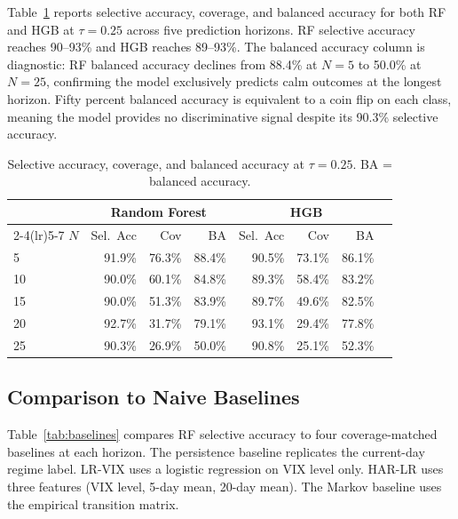\documentclass[runningheads]{llncs}
\begin{document}
Table~\ref{tab:main} reports selective accuracy, coverage, and balanced
accuracy for both RF and HGB at $\tau = 0.25$ across five prediction horizons.
RF selective accuracy reaches 90--93\% and HGB reaches 89--93\%.
The balanced accuracy column is diagnostic: RF balanced accuracy declines from
88.4\% at $N=5$ to 50.0\% at $N=25$, confirming the model exclusively
predicts calm outcomes at the longest horizon. Fifty percent balanced accuracy
is equivalent to a coin flip on each class, meaning the model provides no
discriminative signal despite its 90.3\% selective accuracy.

\begin{table}[t]
\centering
\caption{Selective accuracy, coverage, and balanced accuracy at $\tau=0.25$.
BA = balanced accuracy.}
\label{tab:main}
\setlength{\tabcolsep}{5pt}
\begin{tabular}{lrrrrrrr}
\toprule
 & \multicolumn{3}{c}{Random Forest} & \multicolumn{3}{c}{HGB} \\
\cmidrule(lr){2-4}\cmidrule(lr){5-7}
$N$ & Sel.\ Acc & Cov & BA & Sel.\ Acc & Cov & BA \\
\midrule
5  & 91.9\% & 76.3\% & 88.4\% & 90.5\% & 73.1\% & 86.1\% \\
10 & 90.0\% & 60.1\% & 84.8\% & 89.3\% & 58.4\% & 83.2\% \\
15 & 90.0\% & 51.3\% & 83.9\% & 89.7\% & 49.6\% & 82.5\% \\
20 & 92.7\% & 31.7\% & 79.1\% & 93.1\% & 29.4\% & 77.8\% \\
25 & 90.3\% & 26.9\% & 50.0\% & 90.8\% & 25.1\% & 52.3\% \\
\bottomrule
\end{tabular}
\end{table}

\subsection{Comparison to Naive Baselines}
\label{sec:baselines}

Table~\ref{tab:baselines} compares RF selective accuracy to four
coverage-matched baselines at each horizon. The persistence baseline
replicates the current-day regime label. LR-VIX uses a logistic regression
on VIX level only. HAR-LR uses three features (VIX level, 5-day mean,
20-day mean). The Markov baseline uses the empirical transition matrix.
\end{document}
